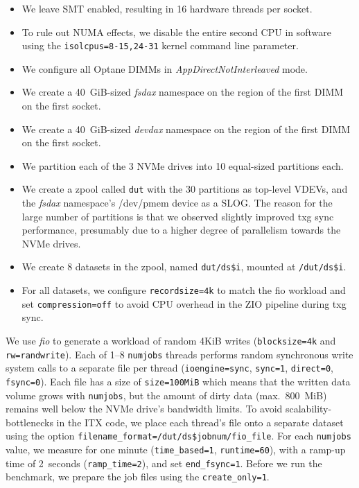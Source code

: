 \documentclass[12pt,a4paper,twoside]{book}
\begin{document}
\begin{itemize}[noitemsep]
    \item We leave SMT enabled, resulting in 16 hardware threads per socket.
    \item To rule out NUMA effects, we disable the entire second CPU in software using the \lstinline{isolcpus=8-15,24-31} kernel command line parameter.
    \item We configure all Optane DIMMs in \textit{AppDirectNotInterleaved} mode.
    \item We create a 40~GiB-sized \textit{fsdax} namespace on the region of the first DIMM on the first socket.
    \item We create a 40~GiB-sized \textit{devdax} namespace on the region of the first DIMM on the first socket.
    \item We partition each of the 3 NVMe drives into 10 equal-sized partitions each.
    \item We create a zpool called \texttt{dut} with the 30 partitions as top-level VDEVs, and the \textit{fsdax} namespace's /dev/pmem device as a SLOG.
        The reason for the large number of partitions is that we observed slightly improved txg sync performance, presumably due to a higher degree of parallelism towards the NVMe drives.
    \item We create 8 datasets in the zpool, named \lstinline{dut/ds$i}, mounted at \lstinline{/dut/ds$i}.
    \item For all datasets, we configure \lstinline{recordsize=4k} to match the fio workload and set \lstinline{compression=off} to avoid CPU overhead in the ZIO pipeline during txg sync.
\end{itemize}

We use \textit{fio} to generate a workload of random 4KiB writes (\lstinline{blocksize=4k} and \lstinline{rw=randwrite}).
Each of 1--8 \lstinline{numjobs} threads performs random synchronous write system calls to a separate file per thread (\lstinline{ioengine=sync}, \lstinline{sync=1}, \lstinline{direct=0}, \lstinline{fsync=0}).
Each file has a size of \lstinline{size=100MiB} which means that the written data volume grows with \lstinline{numjobs}, but the amount of dirty data (max.~800~MiB) remains well below the NVMe drive's bandwidth limits.
To avoid scalability-bottlenecks in the ITX code, we place each thread's file onto a separate dataset using the option \lstinline{filename_format=/dut/ds$jobnum/fio_file}.
For each \lstinline{numjobs} value, we measure for one minute (\lstinline{time_based=1}, \lstinline{runtime=60}), with a ramp-up time of 2~seconds (\lstinline{ramp_time=2}), and set \lstinline{end_fsync=1}.
Before we run the benchmark, we prepare the job files using the \lstinline{create_only=1}.
\end{document}
